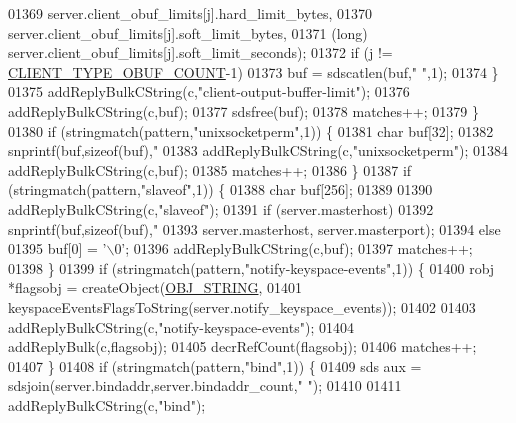\begin{DoxyCode}
{{{{{{{{{{{{01369                     server.client\_obuf\_limits[j].hard\_limit\_bytes,
01370                     server.client\_obuf\_limits[j].soft\_limit\_bytes,
01371                     (\textcolor{keywordtype}{long}) server.client\_obuf\_limits[j].soft\_limit\_seconds);
01372             \textcolor{keywordflow}{if} (j != \hyperlink{server_8h_aea8f6f3fac3a68e35807eba109dbc501}{CLIENT\_TYPE\_OBUF\_COUNT}-1)
01373                 buf = sdscatlen(buf,\textcolor{stringliteral}{" "},1);
01374         \}
01375         addReplyBulkCString(c,\textcolor{stringliteral}{"client-output-buffer-limit"});
01376         addReplyBulkCString(c,buf);
01377         sdsfree(buf);
01378         matches++;
01379     \}
01380     \textcolor{keywordflow}{if} (stringmatch(pattern,\textcolor{stringliteral}{"unixsocketperm"},1)) \{
01381         \textcolor{keywordtype}{char} buf[32];
01382         snprintf(buf,\textcolor{keyword}{sizeof}(buf),\textcolor{stringliteral}{"%
01383         addReplyBulkCString(c,\textcolor{stringliteral}{"unixsocketperm"});
01384         addReplyBulkCString(c,buf);
01385         matches++;
01386     \}
01387     \textcolor{keywordflow}{if} (stringmatch(pattern,\textcolor{stringliteral}{"slaveof"},1)) \{
01388         \textcolor{keywordtype}{char} buf[256];
01389 
01390         addReplyBulkCString(c,\textcolor{stringliteral}{"slaveof"});
01391         \textcolor{keywordflow}{if} (server.masterhost)
01392             snprintf(buf,\textcolor{keyword}{sizeof}(buf),\textcolor{stringliteral}{"%
01393                 server.masterhost, server.masterport);
01394         \textcolor{keywordflow}{else}
01395             buf[0] = \textcolor{stringliteral}{'\(\backslash\)0'};
01396         addReplyBulkCString(c,buf);
01397         matches++;
01398     \}
01399     \textcolor{keywordflow}{if} (stringmatch(pattern,\textcolor{stringliteral}{"notify-keyspace-events"},1)) \{
01400         robj *flagsobj = createObject(\hyperlink{server_8h_a65236ea160f69cdef33ec942092af88f}{OBJ\_STRING},
01401             keyspaceEventsFlagsToString(server.notify\_keyspace\_events));
01402 
01403         addReplyBulkCString(c,\textcolor{stringliteral}{"notify-keyspace-events"});
01404         addReplyBulk(c,flagsobj);
01405         decrRefCount(flagsobj);
01406         matches++;
01407     \}
01408     \textcolor{keywordflow}{if} (stringmatch(pattern,\textcolor{stringliteral}{"bind"},1)) \{
01409         sds aux = sdsjoin(server.bindaddr,server.bindaddr\_count,\textcolor{stringliteral}{" "});
01410 
01411         addReplyBulkCString(c,\textcolor{stringliteral}{"bind"});
}}}}}}}}}}}}}}
\end{DoxyCode}
